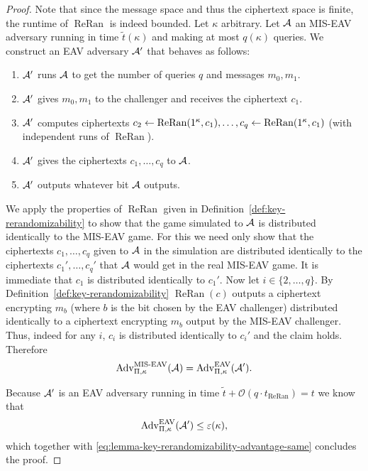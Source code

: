 \begin{proof}
	Note that since the message space and thus the ciphertext space is finite, the runtime of $\operatorname{ReRan}$ is indeed bounded. Let $\kappa$ arbitrary. Let $\mathcal{A}$ an MIS-EAV adversary running in time $\tilde{t}(\kappa)$ and making at most $q(\kappa)$ queries. We construct an EAV adversary $\mathcal{A}'$ that behaves as follows:
	\begin{enumerate}[1.]
		\item $\mathcal{A}'$ runs $\mathcal{A}$ to get the number of queries $q$ and messages $m_0, m_1$.
		\item $\mathcal{A}'$ gives $m_0, m_1$ to the challenger and receives the ciphertext $c_1$.
		\item $\mathcal{A}'$ computes ciphertexts $c_2 \leftarrow \operatorname{ReRan}(1^\kappa, c_1), \ldots, c_q \leftarrow \operatorname{ReRan}(1^\kappa, c_1)$ (with independent runs of $\operatorname{ReRan}$).
		\item $\mathcal{A}'$ gives the ciphertexts $c_1, \ldots, c_q$ to $\mathcal{A}$.
		\item $\mathcal{A}'$ outputs whatever bit $\mathcal{A}$ outputs.
	\end{enumerate}
	We apply the properties of $\operatorname{ReRan}$ given in Definition~\ref{def:key-rerandomizability} to show that the game simulated to $\mathcal{A}$ is distributed identically to the MIS-EAV game. For this we need only show that the ciphertexts $c_1, \ldots, c_q$ given to $\mathcal{A}$ in the simulation are distributed identically to the ciphertexts $c_1', \ldots, c_q'$ that $\mathcal{A}$ would get in the real MIS-EAV game. It is immediate that $c_1$ is distributed identically to $c_1'$. Now let $i \in \{2, \ldots, q\}$. By Definition~\ref{def:key-rerandomizability} $\operatorname{ReRan}(c)$ outputs a ciphertext encrypting $m_b$ (where $b$ is the bit chosen by the EAV challenger) distributed identically to a ciphertext encrypting $m_b$ output by the MIS-EAV challenger. Thus, indeed for any $i$, $c_i$ is distributed identically to $c_i'$ and the claim holds. Therefore
	\begin{equation} \label{eq:lemma-key-rerandomizability-advantage-same}
		\mathrm{Adv}_{\Pi, \kappa}^{\mathrm{MIS\text{-}EAV}}(\mathcal{A}) = \mathrm{Adv}_{\Pi, \kappa}^{\mathrm{EAV}}(\mathcal{A}').
	\end{equation}

	Because $\mathcal{A}'$ is an EAV adversary running in time $\tilde{t} + \mathcal{O}(q \cdot t_{\operatorname{ReRan}}) = t$ we know that
	\[
		\mathrm{Adv}_{\Pi, \kappa}^{\mathrm{EAV}}(\mathcal{A}') \le \varepsilon(\kappa),
	\]
	which together with \eqref{eq:lemma-key-rerandomizability-advantage-same} concludes the proof.
\end{proof}

